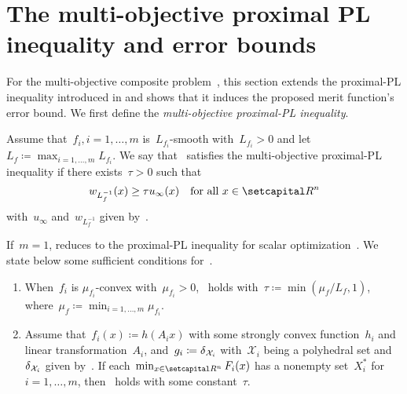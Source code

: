 \documentclass[../main]{subfiles}
\begin{document}
\section{The multi-objective proximal PL inequality and error bounds} 
For the multi-objective composite problem~, this section extends the proximal-PL inequality introduced in  and shows that it induces the proposed merit function's error bound.
We first define the \emph{multi-objective proximal-PL inequality}.
\begin{definition} 
    Assume that~$f_i, i = 1, \dots, m$ is~$L_{f_i}$-smooth with~$L_{f_i} > 0$ and let~$L_f \coloneqq \max_{i = 1, \dots, m} L_{f_i}$.
    We say that~ satisfies the multi-objective proximal-PL inequality if there exists~$\tau > 0$ such that
    \begin{equation} \label{eq:proximal_PL_MO}
        w_{L_f^{-1}}(x) \ge \tau u_\infty(x) \forallcondition{x \in \setR^n}
    \end{equation}
    with~$u_\infty$ and~$w_{L_f^{-1}}$ given by~.
\end{definition}
If~$m = 1$,  reduces to the proximal-PL inequality for scalar optimization~.
We state below some sufficient conditions for~.
\begin{proposition} 
    \begin{enumerate}
        \item When~$f_i$ is $\mu_{f_i}$-convex with~$\mu_{f_i} > 0$,~ holds with~$\tau \coloneqq \min (\mu_f / L_f, 1)$, where~$\mu_f \coloneqq \min_{i = 1, \dots, m} \mu_{f_i}$. 
        \item Assume that~$f_i(x) \coloneqq h(A_i x)$ with some strongly convex function~$h_i$ and linear transformation~$A_i$, and~$g_i \coloneqq \operatorname{\delta}_{\mathcal{X}_i}$ with~$\mathcal{X}_i$ being a polyhedral set and~$\operatorname{\delta}_{\mathcal{X}_i}$ given by~.
            If each~$\min_{x \in \setR^n} F_i(x)$ has a nonempty set~$X_i^*$ for~$i = 1, \dots, m$, then~ holds with some constant~$\tau$. 
    \end{enumerate}
\end{proposition}
\end{document}
